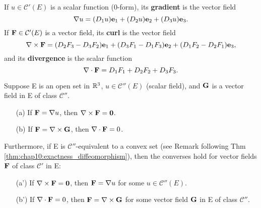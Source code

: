 If $u \in \mathcal{C}'(E)$ is a scalar function (0-form), its
\textbf{gradient} is the vector field
\[
  \nabla u = (D_1 u) \mathbf{e}_1 + (D_2 u) \mathbf{e}_2 + (D_3 u) \mathbf{e}_3.
\]
If $\mathbf{F} \in \mathcal{C}'(E)$ is a vector field, its
\textbf{curl} is the vector field
\[
  \nabla \times \mathbf{F} = (D_2 F_3 - D_3 F_2)\mathbf{e}_1 + (D_3 F_1 -
  D_1 F_3)\mathbf{e}_2 + (D_1 F_2 - D_2 F_1)\mathbf{e}_3,
\]
and its \textbf{divergence} is the scalar function
\[
  \nabla \cdot \mathbf{F} = D_1 F_1 + D_2 F_2 + D_3 F_3.
\]



\begin{theorem}
  \label{thm:chap10:vector_analysis_identities}
  Suppose E is an open set in $\mathbb{R}^3$, $u \in \mathcal{C}''(E)$
  (scalar field), and $\mathbf{G}$ is a vector field in E of class
  $\mathcal{C}''$.
  \begin{itemize}
    \item[(a)] If $\mathbf{F} = \nabla u$, then $\nabla \times \mathbf{F}
      = \mathbf{0}$.
    \item[(b)] If $\mathbf{F} = \nabla \times \mathbf{G}$, then $\nabla
      \cdot \mathbf{F} = 0$.
  \end{itemize}
  Furthermore, if E is $\mathcal{C}''$-equivalent to a convex set
  (see Remark following Thm
  \ref{thm:chap10:exactness_diffeomorphism}), then the converses hold
  for vector fields $\mathbf{F}$ of class $\mathcal{C}'$ in E:
  \begin{itemize}
    \item[(a')] If $\nabla \times \mathbf{F} = \mathbf{0}$, then
      $\mathbf{F} = \nabla u$ for some $u \in \mathcal{C}''(E)$.
    \item[(b')] If $\nabla \cdot \mathbf{F} = 0$, then $\mathbf{F} =
      \nabla \times \mathbf{G}$ for some vector field $\mathbf{G}$ in E
      of class $\mathcal{C}''$.
  \end{itemize}
\end{theorem}

